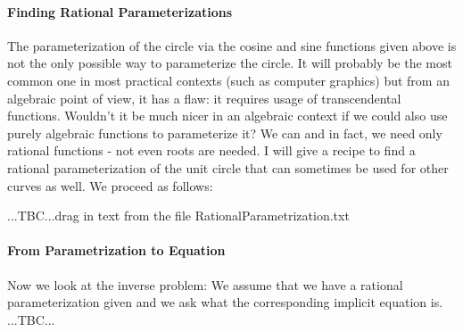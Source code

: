 \paragraph{Finding Rational Parameterizations}
The parameterization of the circle via the cosine and sine functions given above is not the only possible way to parameterize the circle. It will probably be the most common one in most practical contexts (such as computer graphics) but from an algebraic point of view, it has a flaw: it requires usage of transcendental functions. Wouldn't it be much nicer in an algebraic context if we could also use purely algebraic functions to parameterize it? We can and in fact, we need only rational functions - not even roots are needed. I will give a recipe to find a rational parameterization of the unit circle that can sometimes be used for other curves as well. We proceed as follows:


...TBC...drag in text from the file RationalParametrization.txt




\paragraph{From Parametrization to Equation}
Now we look at the inverse problem: We assume that we have a rational parameterization given and we ask what the corresponding implicit equation is. ...TBC...








